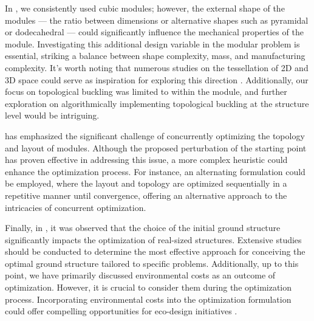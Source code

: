 In , we consistently used cubic modules; however, the external shape of the modules — \ie the ratio between dimensions or alternative shapes such as pyramidal or dodecahedral — could significantly influence the mechanical properties of the module. Investigating this additional design variable in the modular problem is essential, striking a balance between shape complexity, mass, and manufacturing complexity. It's worth noting that numerous studies on the tessellation of 2D and 3D space could serve as inspiration for exploring this direction . Additionally, our focus on topological buckling was limited to within the module, and further exploration on algorithmically implementing topological buckling at the structure level would be intriguing.

 has emphasized the significant challenge of concurrently optimizing the topology and layout of modules. Although the proposed perturbation of the starting point has proven effective in addressing this issue, a more complex heuristic could enhance the optimization process. For instance, an alternating formulation could be employed, where the layout and topology are optimized sequentially in a repetitive manner until convergence, offering an alternative approach to the intricacies of concurrent optimization.

Finally, in , it was observed that the choice of the initial ground structure significantly impacts the optimization of real-sized structures. Extensive studies should be conducted to determine the most effective approach for conceiving the optimal ground structure tailored to specific problems. Additionally, up to this point, we have primarily discussed environmental costs as an outcome of optimization. However, it is crucial to consider them during the optimization process. Incorporating environmental costs into the optimization formulation could offer compelling opportunities for eco-design initiatives .